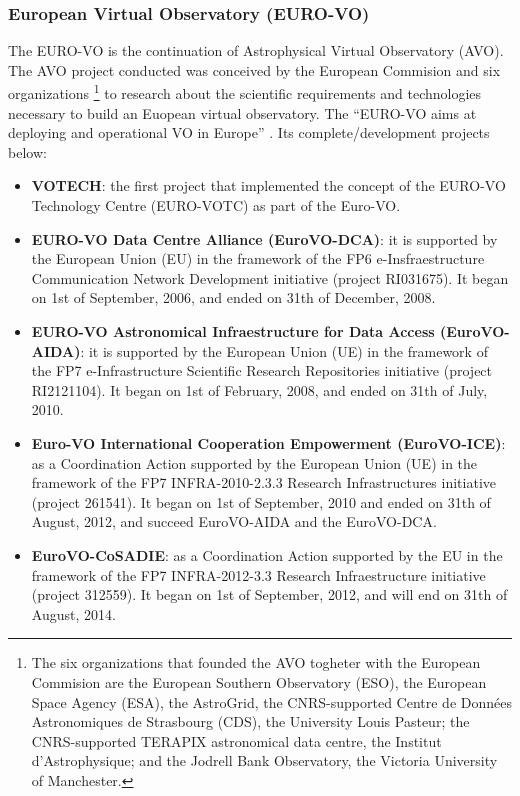 \subsubsection{European Virtual Observatory (EURO-VO)}
The EURO-VO \cite{website:euro-vo-home} is the continuation of Astrophysical
Virtual Observatory (AVO). The AVO project conducted was conceived by the
European Commision and six organizations \footnote{The six organizations that
founded the AVO togheter with the European Commision are the European Southern
Observatory (ESO), the European Space Agency (ESA), the AstroGrid, the
CNRS-supported Centre de Données Astronomiques de Strasbourg (CDS), the
University Louis Pasteur; the CNRS-supported TERAPIX astronomical data centre,
the Institut d'Astrophysique; and the Jodrell Bank Observatory, the Victoria
University of Manchester.} to research about the scientific requirements and
technologies necessary to build an Euopean virtual observatory. The ``EURO-VO
aims at deploying and operational VO in Europe'' \cite{website:euro-vo-home}.
Its complete/development projects below:

\begin{itemize}
\item \textbf{VOTECH}:
the first project that implemented the concept of the EURO-VO Technology Centre
(EURO-VOTC) as part of the Euro-VO.

\item \textbf{EURO-VO Data Centre Alliance (EuroVO-DCA)}:
it is supported by the European Union (EU) in the framework of the FP6
e-Insfraestructure Communication Network Development initiative (project
RI031675). It began on 1st of September, 2006, and ended on 31th of December,
2008.

\item \textbf{EURO-VO Astronomical Infraestructure for Data Access
              (EuroVO-AIDA)}:
it is supported by the European Union (UE) in the framework of the FP7
e-Infrastructure Scientific Research Repositories initiative (project
RI2121104). It began on 1st of February, 2008, and ended on 31th of July, 2010.

\item \textbf{Euro-VO International Cooperation Empowerment (EuroVO-ICE)}:
as a Coordination Action supported by the European Union (UE) in the framework
of the FP7 INFRA-2010-2.3.3 Research Infrastructures initiative (project
261541). It began on 1st of September, 2010 and ended on 31th of August, 2012,
and succeed EuroVO-AIDA and the EuroVO-DCA.

\item \textbf{EuroVO-CoSADIE}:
as a Coordination Action supported by the EU in the framework of the FP7
INFRA-2012-3.3 Research Infraestructure initiative (project 312559). It began on
1st of September, 2012, and will end on 31th of August, 2014.
\end{itemize}

